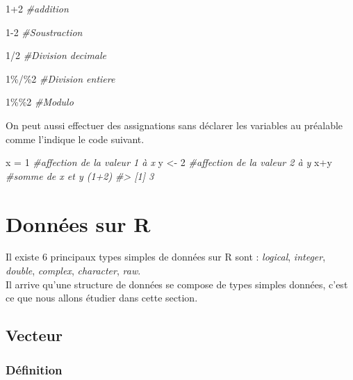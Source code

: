 \documentclass[
]{book}
\newenvironment{Shaded}{\begin{snugshade}}{\end{snugshade}}
\newcommand{\CommentTok}[1]{\textcolor[rgb]{0.56,0.35,0.01}{\textit{#1}}}
\newcommand{\DecValTok}[1]{\textcolor[rgb]{0.00,0.00,0.81}{#1}}
\newcommand{\NormalTok}[1]{#1}
\newcommand{\OtherTok}[1]{\textcolor[rgb]{0.56,0.35,0.01}{#1}}
\newcommand{\SpecialCharTok}[1]{\textcolor[rgb]{0.00,0.00,0.00}{#1}}
\theoremstyle{definition}
\theoremstyle{definition}
\theoremstyle{definition}
\theoremstyle{definition}
\theoremstyle{remark}
\begin{document}
\begin{Shaded}
\begin{Highlighting}[]
\DecValTok{1}\SpecialCharTok{+}\DecValTok{2} \CommentTok{\#addition}

\DecValTok{1{-}2} \CommentTok{\#Soustraction}

\DecValTok{1}\SpecialCharTok{/}\DecValTok{2} \CommentTok{\#Division decimale}

\DecValTok{1}\SpecialCharTok{\%/\%}\DecValTok{2} \CommentTok{\#Division entiere}

\DecValTok{1}\SpecialCharTok{\%\%}\DecValTok{2} \CommentTok{\#Modulo}
\end{Highlighting}
\end{Shaded}

On peut aussi effectuer des assignations sans déclarer les variables au préalable comme l'indique le code suivant.

\begin{Shaded}
\begin{Highlighting}[]
\NormalTok{x }\OtherTok{=} \DecValTok{1} \CommentTok{\#affection de la valeur 1 à x}
\NormalTok{y }\OtherTok{\textless{}{-}} \DecValTok{2} \CommentTok{\#affection de la valeur 2 à y}
\NormalTok{x}\SpecialCharTok{+}\NormalTok{y }\CommentTok{\#somme de x et y (1+2)}
\CommentTok{\#\textgreater{} [1] 3}
\end{Highlighting}
\end{Shaded}

\hypertarget{data-R}{%
\section{Données sur R}\label{data-R}}

Il existe 6 principaux types simples de données sur R sont : \emph{logical}, \emph{integer}, \emph{double}, \emph{complex}, \emph{character}, \emph{raw}.\\
Il arrive qu'une structure de données se compose de types simples données, c'est ce que nous allons étudier dans cette section.

\hypertarget{vecteur}{%
\subsection{Vecteur}\label{vecteur}}

\hypertarget{duxe9finition}{%
\subsubsection*{Définition}\label{duxe9finition}}
\end{document}
